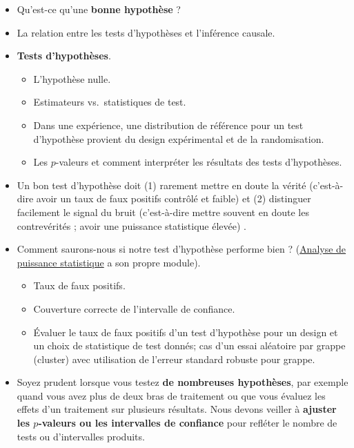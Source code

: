 \documentclass[
  12pt,
]{book}
\begin{document}
\begin{itemize}
\item
  Qu'est-ce qu'une \textbf{bonne hypothèse} ?
\item
  La relation entre les tests d'hypothèses et l'inférence causale.
\item
  \textbf{Tests d'hypothèses}.

  \begin{itemize}
  \item
    L'hypothèse nulle.
  \item
    Estimateurs vs.~statistiques de test.
  \item
    Dans une expérience, une distribution de référence pour un test d'hypothèse provient du design expérimental et de la randomisation.
  \item
    Les \(p\)-valeurs et comment interpréter les résultats des tests d'hypothèses.
  \end{itemize}
\item
  Un bon test d'hypothèse doit (1) rarement mettre en doute la vérité (c'est-à-dire avoir un taux de faux positifs contrôlé et faible) et (2) distinguer facilement le signal du bruit (c'est-à-dire mettre souvent en doute les contrevérités ; avoir une puissance statistique élevée) .
\item
  Comment saurons-nous si notre test d'hypothèse performe bien ? (\href{statistical-power-and-design-diagnosands.html}{Analyse de puissance statistique} a son propre module).

  \begin{itemize}
  \item
    Taux de faux positifs.
  \item
    Couverture correcte de l'intervalle de confiance.
  \item
    Évaluer le taux de faux positifs d'un test d'hypothèse pour un design et un choix de statistique de test donnés;
    cas d'un essai aléatoire par grappe (cluster) avec utilisation de l'erreur standard robuste pour grappe.
  \end{itemize}
\item
  Soyez prudent lorsque vous testez \textbf{de nombreuses hypothèses}, par exemple quand vous avez plus de deux bras de traitement ou que vous évaluez les effets d'un traitement sur plusieurs résultats. Nous devons veiller à \textbf{ajuster les \(p\)-valeurs ou les intervalles de confiance} pour refléter le nombre de tests ou d'intervalles produits.
\end{itemize}
\end{document}
